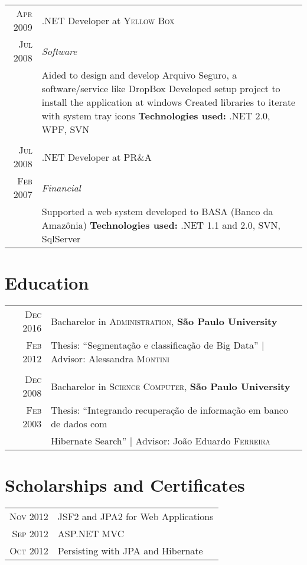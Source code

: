 \documentclass[a4paper,10pt]{article}
\begin{document}
\begin{tabular}{r|p{11cm}}
\textsc{Apr 2009} & .NET Developer at \textsc{Yellow Box}\\
\textsc{Jul 2008}&\emph{Software}\\&\footnotesize{ Aided to design and develop Arquivo Seguro, a software/service like DropBox\newline
   Developed setup project to install the application at windows\newline
   Created libraries to iterate with system tray icons\newline
\textbf{Technologies used:} .NET 2.0, WPF, SVN
 }\\\multicolumn{2}{c}{} \\
 \textsc{Jul 2008} & .NET Developer at \textsc{PR\&A} \\\textsc{Feb 2007}&\emph{Financial}\\&\footnotesize{  Supported a web system developed to BASA (Banco da Amazônia) \newline
\textbf{Technologies used:} .NET 1.1 and 2.0, SVN, SqlServer
 }
\end{tabular}

\section{Education}
\begin{tabular}{rl} 
 \textsc{Dec} 2016 & Bacharelor in \textsc{Administration}, \textbf{São Paulo University}\\
\textsc{Feb} 2012&Thesis: ``Segmentação e classificação de Big Data'' | \small Advisor: Alessandra \textsc{Montini}\\\\
\textsc{Dec} 2008& Bacharelor in \textsc{Science Computer}, \textbf{São Paulo University}\\
\textsc{Feb} 2003& Thesis: ``Integrando recuperação de informação em banco de dados com \\
& Hibernate Search'' | \small Advisor: João Eduardo \textsc{Ferreira}\\
\end{tabular}

\section{Scholarships and Certificates}
\begin{tabular}{rl}
 \textsc{Nov} 2012 & JSF2 and JPA2 for Web Applications\\
\textsc{Sep} 2012 & ASP.NET MVC\\
\textsc{Oct} 2012 & Persisting with JPA and Hibernate\\
\end{tabular}
\end{document}
